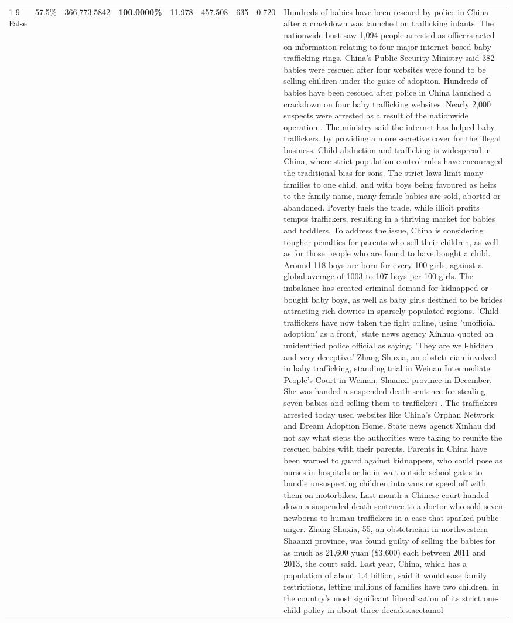 \begin{table}[H]
\begin{tabular}{lllrlllll}
\cline{1-9}
False & 57.5\% & 366,773.5842 & \bfseries \color{red} 100.0000\% & 11.978 & 457.508 & 635 & 0.720 & Hundreds of babies have been rescued by police in China after a crackdown was launched on trafficking infants. The nationwide bust saw 1,094 people arrested as officers acted on information relating to four major internet-based baby trafficking rings. China's Public Security Ministry said 382 babies were rescued after four websites were found to be selling children under the guise of adoption. Hundreds of babies have been rescued after police in China launched a crackdown on four baby trafficking websites. Nearly 2,000 suspects were arrested as a result of the nationwide operation . The ministry said the internet has helped baby traffickers, by providing a more secretive cover for the illegal business. Child abduction and trafficking is widespread in China, where strict population control rules have encouraged the traditional bias for sons. The strict laws limit many families to one child, and with boys being favoured as heirs to the family name, many female babies are sold, aborted or abandoned. Poverty fuels the trade, while illicit profits tempts traffickers, resulting in a thriving market for babies and toddlers. To address the issue, China is considering tougher penalties for parents who sell their children, as well as for those people who are found to have bought a child. Around 118 boys are born for every 100 girls, against a global average of 1003 to 107 boys per 100 girls. The imbalance has created criminal demand for kidnapped or bought baby boys, as well as baby girls destined to be brides attracting rich dowries in sparsely populated regions. 'Child traffickers have now taken the fight online, using 'unofficial adoption' as a front,' state news agency Xinhua quoted an unidentified police official as saying. 'They are well-hidden and very deceptive.' Zhang Shuxia, an obstetrician involved in baby trafficking, standing trial in Weinan Intermediate People's Court in Weinan, Shaanxi province in December. She was handed a suspended death sentence for stealing seven babies and selling them to traffickers . The traffickers arrested today used websites like China's Orphan Network and Dream Adoption Home. State news agenct Xinhau did not say what steps the authorities were taking to reunite the rescued babies with their parents. Parents in China have been warned to guard against kidnappers, who could pose as nurses in hospitals or lie in wait outside school gates to bundle unsuspecting children into vans or speed off with them on motorbikes. Last month a Chinese court handed down a suspended death sentence to a doctor who sold seven newborns to human traffickers in a case that sparked public anger. Zhang Shuxia, 55, an obstetrician in northwestern Shaanxi province, was found guilty of selling the babies for as much as 21,600 yuan (\$3,600) each between 2011 and 2013, the court said. Last year, China, which has a population of about 1.4 billion, said it would ease family restrictions, letting millions of families have two children, in the country's most significant liberalisation of its strict one-child policy in about three decades.acetamol \\

\end{tabular}
\end{table}
